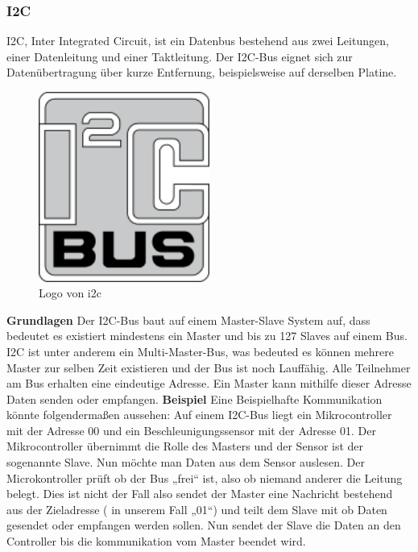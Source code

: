 \subsubsection{I2C}
\label{subsec:I2C}
I2C, Inter Integrated Circuit, ist ein Datenbus bestehend aus zwei Leitungen, einer Datenleitung und einer Taktleitung. Der I2C-Bus eignet sich zur Datenübertragung über kurze Entfernung, beispielsweise auf derselben Platine.

\begin{figure}[!htb]\centering
	\includegraphics[width=0.5\textwidth]{images/i2c}
	\caption{Logo von i2c \cite{PERT.CH2-i2c.logo}}\label{Fig:imgi2cLogo}
\end{figure}

\textbf{Grundlagen\newline}
Der I2C-Bus baut auf einem Master-Slave System auf, dass bedeutet es existiert mindestens ein Master und bis zu 127 Slaves auf einem Bus. I2C ist unter anderem ein Multi-Master-Bus, was bedeuted es können mehrere Master zur selben Zeit existieren und der Bus ist noch Lauffähig.
Alle Teilnehmer am Bus erhalten eine eindeutige Adresse. Ein Master kann mithilfe dieser Adresse Daten senden oder empfangen.
\nextline
\textbf{Beispiel\nextline}
Eine Beispielhafte Kommunikation könnte folgendermaßen aussehen:
\nextline
Auf einem I2C-Bus liegt ein Mikrocontroller mit der Adresse 00 und ein Beschleunigungssensor mit der Adresse 01. Der Mikrocontroller übernimmt die Rolle des Masters und der Sensor ist der sogenannte Slave. Nun möchte man Daten aus dem Sensor auslesen. Der Microkontroller prüft ob der Bus „frei“ ist, also ob niemand anderer die Leitung belegt. Dies ist nicht der Fall also sendet der Master eine Nachricht bestehend aus der Zieladresse ( in unserem Fall „01“) und teilt dem Slave mit ob Daten gesendet oder empfangen werden sollen. Nun sendet der Slave die Daten an den Controller bis die kommunikation vom Master beendet wird.


\clearpage %